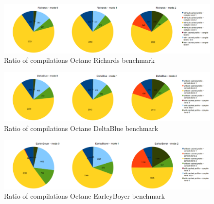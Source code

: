 \begin{figure}[ht]
  \begin{center}
    \centering
    \includegraphics[width=1.0\textwidth]{figures/richards_compilations.png}
    \caption{Ratio of compilations Octane Richards benchmark}
    \label{f:richards_compilations}
  \end{center}
\end{figure}
\begin{figure}[ht]
  \begin{center}
    \centering
    \includegraphics[width=1.0\textwidth]{figures/deltablue_compilations.png}
    \caption{Ratio of compilations Octane DeltaBlue benchmark}
    \label{f:deltablue_compilations}
  \end{center}
\end{figure}
\begin{figure}[ht]
  \begin{center}
    \centering
    \includegraphics[width=1.0\textwidth]{figures/earleyboyer_compilations.png}
    \caption{Ratio of compilations Octane EarleyBoyer benchmark}
    \label{f:earleyboyer_compilations}
  \end{center}
\end{figure}
